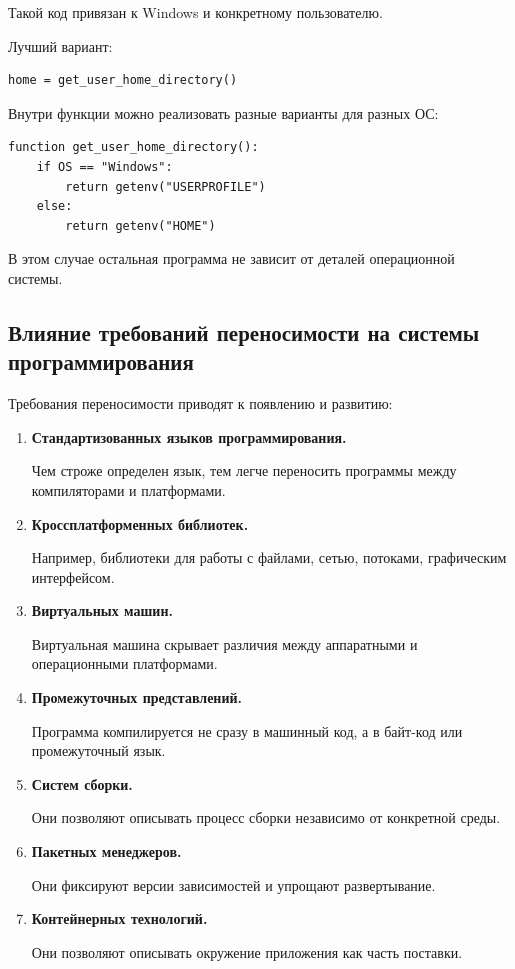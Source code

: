 \documentclass[12pt,a4paper]{article}
\begin{document}
Такой код привязан к Windows и конкретному пользователю.

Лучший вариант:
\begin{verbatim}
home = get_user_home_directory()
\end{verbatim}

Внутри функции можно реализовать разные варианты для разных ОС:
\begin{verbatim}
function get_user_home_directory():
    if OS == "Windows":
        return getenv("USERPROFILE")
    else:
        return getenv("HOME")
\end{verbatim}

В этом случае остальная программа не зависит от деталей операционной системы.

\subsection{Влияние требований переносимости на системы программирования}

Требования переносимости приводят к появлению и развитию:

\begin{enumerate}
    \item \textbf{Стандартизованных языков программирования.}

    Чем строже определен язык, тем легче переносить программы между компиляторами и платформами.

    \item \textbf{Кроссплатформенных библиотек.}

    Например, библиотеки для работы с файлами, сетью, потоками, графическим интерфейсом.

    \item \textbf{Виртуальных машин.}

    Виртуальная машина скрывает различия между аппаратными и операционными платформами.

    \item \textbf{Промежуточных представлений.}

    Программа компилируется не сразу в машинный код, а в байт-код или промежуточный язык.

    \item \textbf{Систем сборки.}

    Они позволяют описывать процесс сборки независимо от конкретной среды.

    \item \textbf{Пакетных менеджеров.}

    Они фиксируют версии зависимостей и упрощают развертывание.

    \item \textbf{Контейнерных технологий.}

    Они позволяют описывать окружение приложения как часть поставки.
\end{enumerate}
\end{document}
